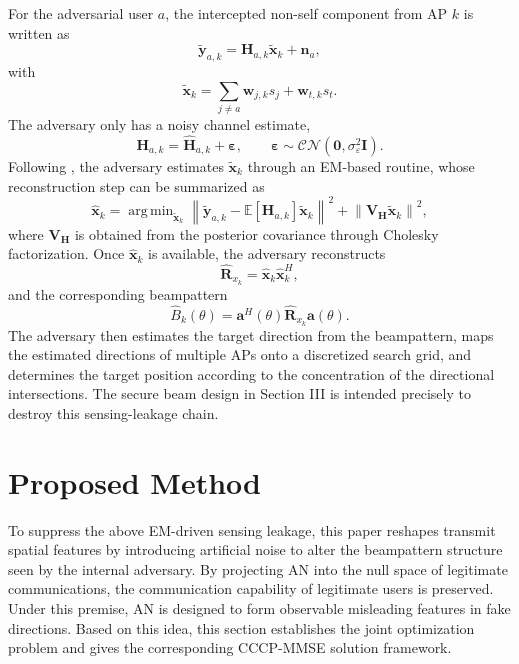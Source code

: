 \documentclass[conference,twocolumn,a4paper]{IEEEtran}
\DeclareMathOperator*{\argmin}{arg\,min}
\begin{document}
For the adversarial user $a$, the intercepted non-self component from AP $k$ is written as
\begin{equation}
\widetilde{\mathbf{y}}_{a,k}=\mathbf{H}_{a,k}\widetilde{\mathbf{x}}_k+\mathbf{n}_a,
\end{equation}
with
\begin{equation}
\widetilde{\mathbf{x}}_k=\sum_{j\neq a}\mathbf{w}_{j,k}s_j+\mathbf{w}_{t,k}s_t.
\label{eq:xtilde}
\end{equation}
The adversary only has a noisy channel estimate,
\begin{equation}
\mathbf{H}_{a,k}=\widehat{\mathbf{H}}_{a,k}+\boldsymbol{\varepsilon}, \qquad \boldsymbol{\varepsilon}\sim\mathcal{CN}(\mathbf{0},\sigma_\varepsilon^2\mathbf{I}).
\end{equation}
Following \cite{dasilva2023multistaticcf}, the adversary estimates $\widetilde{\mathbf{x}}_k$ through an EM-based routine, whose reconstruction step can be summarized as
\begin{equation}
\widehat{\mathbf{x}}_k=\argmin_{\widetilde{\mathbf{x}}_k}\left\|\widetilde{\mathbf{y}}_{a,k}-\mathbb{E}[\mathbf{H}_{a,k}]\widetilde{\mathbf{x}}_k\right\|^2+\left\|\mathbf{V}_{\mathbf{H}}\widetilde{\mathbf{x}}_k\right\|^2,
\label{eq:em-final}
\end{equation}
where $\mathbf{V}_{\mathbf{H}}$ is obtained from the posterior covariance through Cholesky factorization. Once $\widehat{\mathbf{x}}_k$ is available, the adversary reconstructs
\begin{equation}
\widehat{\mathbf{R}}_{x_k}=\widehat{\mathbf{x}}_k\widehat{\mathbf{x}}_k^H,
\end{equation}
and the corresponding beampattern
\begin{equation}
\widehat{B}_k(\theta)=\mathbf{a}^H(\theta)\widehat{\mathbf{R}}_{x_k}\mathbf{a}(\theta).
\end{equation}
The adversary then estimates the target direction from the beampattern, maps the estimated directions of multiple APs onto a discretized search grid, and determines the target position according to the concentration of the directional intersections. The secure beam design in Section III is intended precisely to destroy this sensing-leakage chain.

\section{Proposed Method}
To suppress the above EM-driven sensing leakage, this paper reshapes transmit spatial features by introducing artificial noise to alter the beampattern structure seen by the internal adversary. By projecting AN into the null space of legitimate communications, the communication capability of legitimate users is preserved. Under this premise, AN is designed to form observable misleading features in fake directions. Based on this idea, this section establishes the joint optimization problem and gives the corresponding CCCP-MMSE solution framework.
\end{document}
